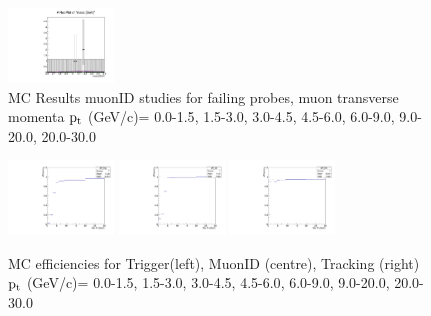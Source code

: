 \documentclass{article}
\begin{document}
\begin{figure}
    \includegraphics[width=0.25\textwidth]{../PlotsRooFitMC/croofit_id_fail_6.pdf}
    \caption{MC Results muonID studies for failing probes, muon transverse momenta
    $\rm p_{t}$ (GeV/c)= {0.0-1.5}, {1.5-3.0}, {3.0-4.5}, {4.5-6.0}, 
    {6.0-9.0}, {9.0-20.0}, {20.0-30.0}}
\end{figure}

\begin{figure}
    \includegraphics[width=0.25\textwidth]{../PlotsRooFitMC/eff_trg.pdf}
    \includegraphics[width=0.25\textwidth]{../PlotsRooFitMC/eff_id.pdf}
    \includegraphics[width=0.25\textwidth]{../PlotsRooFitMC/eff_trk.pdf}
    \caption{MC efficiencies for Trigger(left), MuonID (centre), Tracking (right) 
    $\rm p_{t}$ (GeV/c)= {0.0-1.5}, {1.5-3.0}, {3.0-4.5}, {4.5-6.0}, {6.0-9.0}, {9.0-20.0}, {20.0-30.0}}
\end{figure}



\end{document}
